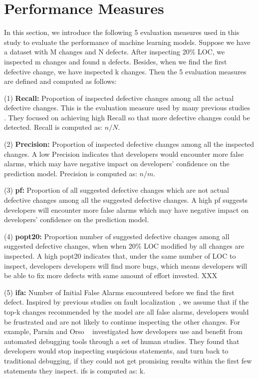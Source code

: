 \documentclass[sigconf,review]{acmart}
\theoremstyle{break}
\begin{document}
\section{Performance Measures}
\label{sec:Measures}

In this section, we introduce the following 5 evaluation measures used in this study to evaluate the performance of machine learning models. Suppose we have a dataset with M changes and N defects. After inspecting 20\% LOC, we inspected m changes and found n defects. Besides, when we find the first defective change, we have inspected k changes. Then the 5 evaluation measures are defined and computed as follows:

(1) \textbf{Recall:} Proportion of inspected defective changes among all the actual defective changes. This is the evaluation measure used by many previous studies~\cite{kamei2012large,yang2016effort,yang2017tlel,xia2016collective,yang2015deep} . They focused on achieving high Recall so that more defective changes could be detected. Recall is computed as: $n/N$.

(2) \textbf{Precision:} Proportion of inspected defective changes among all the inspected changes. A low Precision indicates that developers would encounter more false alarms, which may have negative impact on developers' confidence on the prediction model. Precision is computed as: $n/m$.

(3) \textbf{pf:} Proportion of all suggested defective changes which are not actual defective changes among all the suggested defective changes. A high pf suggests developers will encounter more false alarms which may have negative impact on developers' confidence on the prediction model.

(4) \textbf{popt20:} Proportion number of suggested defective changes among all suggested defective changes, when when 20\% LOC modified by all changes are inspected. A high popt20 indicates that, under the same number of LOC to inspect, developers developers will find more bugs, which means developers will be able to fix more defects with same amount of effort invested. XXX

(5) \textbf{ifa:} Number of Initial False Alarms encountered before we find the first defect. Inspired by previous studies on fault localization~\cite{parnin2011automated,kochhar2016practitioners,xia2016automated}, we assume that if the top-k changes recommended by the model are all false alarms, developers would be frustrated and are not likely to continue inspecting the other changes. For example, Parnin and Orso ~\cite{parnin2011automated} investigated how developers use and benefit from automated debugging tools through a set of human studies. They found that developers would stop inspecting suspicious statements, and turn back to traditional debugging, if they could not get promising results within the first few statements they inspect. ifs is computed as: k.
\end{document}
